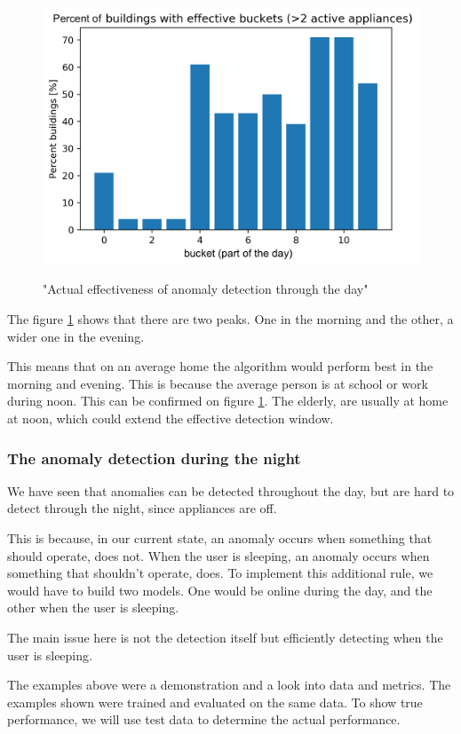 \begin{figure}[H]
	\centering
	\caption{"Actual effectiveness of anomaly detection through the day"}
	\includegraphics[width=.8\textwidth]{Figures/EC/all_ignored_buckets_dist_incl_act.png}
	\label{fig:ignored_buckets_act}
\end{figure}

The figure \ref{fig:ignored_buckets_act} shows that there are two peaks.
One in the morning and the other, a wider one in the evening.

This means that on an average home the algorithm would perform best in the morning and evening.
This is because the average person is at school or work during noon. 
This can be confirmed on figure \ref{fig:ignored_buckets_act}.
The elderly, are usually at home at noon, which could extend the effective detection window.


\subsubsection{The anomaly detection during the night}

We have seen that anomalies can be detected throughout the day,
but are hard to detect through the night, since appliances are off.

This is because, in our current state, an anomaly occurs when something that should operate, does not.
When the user is sleeping, an anomaly occurs when something that shouldn't operate, does. 
To implement this additional rule, we would have to build two models.
One would be online during the day, and the other when the user is sleeping.

The main issue here is not the detection itself but efficiently detecting
when the user is sleeping. 

The examples above were a demonstration and a look into data and metrics. 
The examples shown were trained and evaluated on the same data. 
To show true performance, we will use test data to determine the actual performance. 

